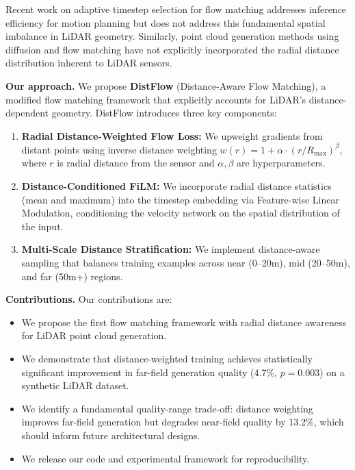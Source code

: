 \documentclass{article}
\begin{document}
Recent work on adaptive timestep selection for flow matching \citep{tariq2026adaptive} addresses inference efficiency for motion planning but does not address this fundamental spatial imbalance in LiDAR geometry. Similarly, point cloud generation methods using diffusion \citep{luo2021diffusion} and flow matching \citep{matteazzi2026liflow,sun2025rap} have not explicitly incorporated the radial distance distribution inherent to LiDAR sensors.

\textbf{Our approach.} We propose \textbf{DistFlow} (Distance-Aware Flow Matching), a modified flow matching framework that explicitly accounts for LiDAR's distance-dependent geometry. DistFlow introduces three key components:

\begin{enumerate}
    \item \textbf{Radial Distance-Weighted Flow Loss:} We upweight gradients from distant points using inverse distance weighting $w(r) = 1 + \alpha \cdot (r/R_{\max})^\beta$, where $r$ is radial distance from the sensor and $\alpha, \beta$ are hyperparameters.
    \item \textbf{Distance-Conditioned FiLM:} We incorporate radial distance statistics (mean and maximum) into the timestep embedding via Feature-wise Linear Modulation, conditioning the velocity network on the spatial distribution of the input.
    \item \textbf{Multi-Scale Distance Stratification:} We implement distance-aware sampling that balances training examples across near (0--20m), mid (20--50m), and far (50m+) regions.
\end{enumerate}

\textbf{Contributions.} Our contributions are:
\begin{itemize}
    \item We propose the first flow matching framework with radial distance awareness for LiDAR point cloud generation.
    \item We demonstrate that distance-weighted training achieves statistically significant improvement in far-field generation quality (4.7\%, $p=0.003$) on a synthetic LiDAR dataset.
    \item We identify a fundamental quality-range trade-off: distance weighting improves far-field generation but degrades near-field quality by 13.2\%, which should inform future architectural designs.
    \item We release our code and experimental framework for reproducibility.
\end{itemize}
\end{document}
